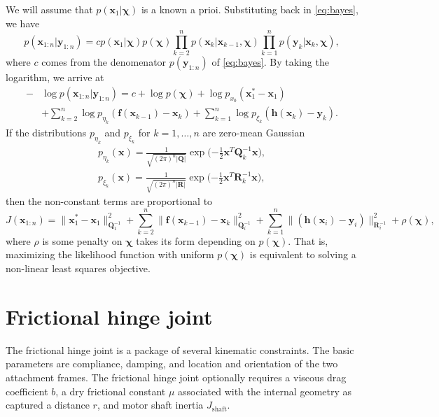 \documentclass[preprint,12pt]{elsarticle}
\let\vec\bm
\let\mat\mathbf
\def\param{\vec{\chi}}
\numberwithin{equation}{section}
\begin{document}
We will assume that $p(\vec{x}_1 | \param)$ is a known a prioi.
Substituting back in \eqref{eq:bayes}, we have
\begin{equation}
    p(\vec{x}_{1:n} | \vec{y}_{1:n}) = c p(\vec{x}_1 | \param) p(\param)\prod_{k=2}^n p(\vec{x}_k| \vec{x}_{k-1}, \param) \prod_{k=1}^n p(\vec{y}_k| \vec{x}_k, \param),
\end{equation}
where $c$ comes from the denomenator $p(\vec{y}_{1:n})$ of \eqref{eq:bayes}.
By taking the logarithm, we arrive at
\begin{align}
    -&\log{p(\vec{x}_{1:n} | \vec{y}_{1:n})} = c + \log{p(\param)} + \log{p_{x_0}(\vec{x}^*_1 - \vec{x}_1)} \nonumber \\
    &+ \sum_{k=2}^n \log{p_{\eta_k}(\vec{f}(\vec{x}_{k-1}) - \vec{x}_{k})}
    + \sum_{k=1}^n \log{p_{\xi_k}(\vec{h}(\vec{x}_k) - \vec{y}_{k})}.
\end{align}
If the distributions $p_{\eta_k}$ and $p_{\xi_k}$ for $k=1,\hdots,n$ are zero-mean Gaussian
\begin{equation}
    \begin{aligned}
        p_{\eta_k}(\vec{x}) = \frac{1}{\sqrt{(2\pi)^{n} |\mat{Q}|}} \exp \Big({-\frac{1}{2} \vec{x}^T \mat{Q}^{-1}_k \vec{x}} \Big), \\
        p_{\xi_k}(\vec{x}) = \frac{1}{\sqrt{(2\pi)^{n} |\mat{R}|}} \exp \Big({-\frac{1}{2} \vec{x}^T \mat{R}^{-1}_k \vec{x}} \Big),
    \end{aligned}
\end{equation}
then the non-constant terms are proportional to
\begin{equation}
    J(\vec{x}_{1:n}) =  \|\vec{x}^*_1 - \vec{x}_1\|^2_{\mat{Q}_{1}^{-1}}  + \sum_{k=2}^n \|\vec{f}(\vec{x}_{k-1}) - \vec{x}_k\|^2_{\mat{Q}_i^{-1}} + \sum_{k=1}^n \|(\vec{h}(\vec{x}_i) - \vec{y}_i)\|^2_{\mat{R}_i^{-1}} + \rho(\param),
\end{equation}
where $\rho$ is some penalty on $\param$ takes its form depending on $p(\param)$.
That is, maximizing the likelihood function with uniform $p(\param)$ is equivalent to solving a non-linear least squares objective.

\section{Frictional hinge joint}
\label{appendix:hinge}
The frictional hinge joint is a package of several kinematic constraints.
The basic parameters are compliance, damping, and location and orientation of the two attachment frames.
The frictional hinge joint optionally requires a viscous drag coefficient $b$, a dry frictional constant $\mu$ associated with the internal geometry as captured a distance $r$, and motor shaft inertia $J_{\text{shaft}}$.
\end{document}
